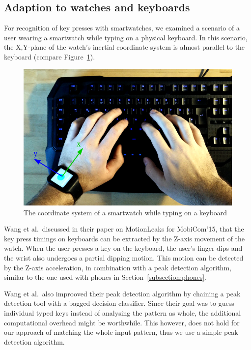 \subsection{Adaption to watches and keyboards}
For recognition of key presses with smartwatches, we examined a scenario of a user wearing a smartwatch while typing on a physical keyboard. In this scenario, the X,Y-plane of the watch's inertial coordinate system is almost parallel to the keyboard (compare Figure~\ref{fig:watchcoordinate}).

\begin{figure}
    \centering
    \includegraphics[width=\textwidth]{figures/WatchCoordinateSystem.png}
    \caption{The coordinate system of a smartwatch while typing on a keyboard}
    \label{fig:watchcoordinate}
\end{figure}

Wang et al.\cite{wang2015mole}\ discussed in their paper on MotionLeaks for MobiCom'15, that the key press timings on keyboards can be extracted by the Z-axis movement of the watch. When the user presses a key on the keyboard, the user's finger dips and the wrist also undergoes a partial dipping motion. This motion can be detected by the Z-axis acceleration, in combination with a peak detection algorithm, similar to the one used with phones in Section~\ref{subsection:phones}.

Wang et al.\ also improoved their peak detection algorithm by chaining a peak detection tool with a bagged decision classifier. Since their goal was to guess individual typed keys instead of analysing the pattern as whole, the additional computational overhead might be worthwhile. This however, does not hold for our approach of matching the whole  input pattern, thus we use a simple peak detection algorithm.

